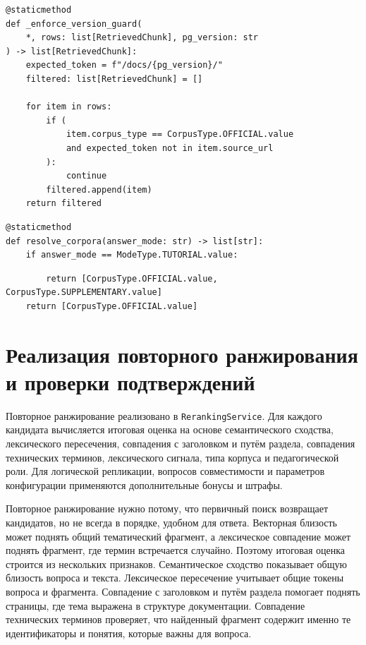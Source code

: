 \begin{listingblock}[24mm]
\label{listing:appendix-version-guard}
\begin{verbatim}
@staticmethod
def _enforce_version_guard(
    *, rows: list[RetrievedChunk], pg_version: str
) -> list[RetrievedChunk]:
    expected_token = f"/docs/{pg_version}/"
    filtered: list[RetrievedChunk] = []

    for item in rows:
        if (
            item.corpus_type == CorpusType.OFFICIAL.value
            and expected_token not in item.source_url
        ):
            continue
        filtered.append(item)
    return filtered
\end{verbatim}
\end{listingblock}

\enlargethispage{18mm}
\begin{listingblock}[24mm]
\label{listing:appendix-corpora}
\begin{verbatim}
@staticmethod
def resolve_corpora(answer_mode: str) -> list[str]:
    if answer_mode == ModeType.TUTORIAL.value:
\end{verbatim}
\end{listingblock}

\begin{listingblock}[24mm]
\begin{verbatim}
        return [CorpusType.OFFICIAL.value, CorpusType.SUPPLEMENTARY.value]
    return [CorpusType.OFFICIAL.value]
\end{verbatim}
\end{listingblock}

\section{Реализация повторного ранжирования и проверки подтверждений}

Повторное ранжирование реализовано в \texttt{RerankingService}. Для каждого кандидата вычисляется итоговая оценка на основе семантического сходства, лексического пересечения, совпадения с заголовком и путём раздела, совпадения технических терминов, лексического сигнала, типа корпуса и педагогической роли. Для логической репликации, вопросов совместимости и параметров конфигурации применяются дополнительные бонусы и штрафы.

Повторное ранжирование нужно потому, что первичный поиск возвращает кандидатов, но не всегда в порядке, удобном для ответа. Векторная близость может поднять общий тематический фрагмент, а лексическое совпадение может поднять фрагмент, где термин встречается случайно. Поэтому итоговая оценка строится из нескольких признаков. Семантическое сходство показывает общую близость вопроса и текста. Лексическое пересечение учитывает общие токены вопроса и фрагмента. Совпадение с заголовком и путём раздела помогает поднять страницы, где тема выражена в структуре документации. Совпадение технических терминов проверяет, что найденный фрагмент содержит именно те идентификаторы и понятия, которые важны для вопроса.

